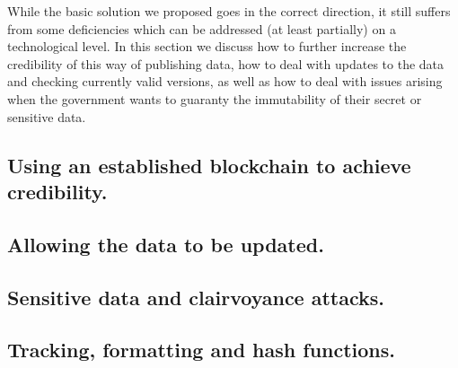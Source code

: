

While the basic solution we proposed goes in the correct direction, it still suffers from some deficiencies which can be addressed (at least partially) on a technological level. In this section we discuss how to further increase the credibility of this way of publishing data, how to deal with updates to the data and checking currently valid versions, as well as how to deal with issues arising when the government wants to guaranty the immutability of their secret or sensitive data. %

\subsection{Using an established blockchain to achieve credibility.}



\subsection{Allowing the data to be updated.}
\label{sec:updates}



%


\subsection{Sensitive data and clairvoyance attacks.}



\subsection{Tracking, formatting and hash functions.}



